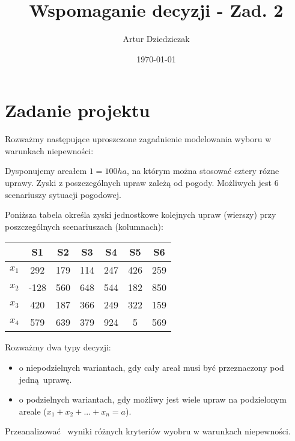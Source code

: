 \documentclass{article}
\title{Wspomaganie decyzji - Zad. 2}
\author{Artur Dziedziczak}
\date{\today}
\begin{document}
\maketitle

\newpage

\tableofcontents

\newpage

\section{Zadanie projektu}

Rozważmy następujące uproszczone zagadnienie modelowania wyboru w warunkach niepewności:

Dysponujemy areałem $1 = 100ha$, na którym można stosować cztery rózne uprawy. Zyski z poszczególnych upraw zależą od pogody. Możliwych jest 6 scenariuszy sytuacji pogodowej.

Poniższa tabela określa zyski jednostkowe kolejnych upraw (wierszy) przy poszczególnych scenariuszach (kolumnach):

\begin{table}[H]
  \begin{center}
    \begin{tabular}{ c |  c  c   c   c   c   c  }
      & S1 & S2 & S3 & S4 & S5 & S6 \\
      \hline
      $x_1$ & 292 & 179 & 114 & 247 & 426 & 259 \\
      $x_2$ & -128 & 560 & 648 & 544 & 182 & 850 \\
      $x_3$ & 420 & 187 & 366 & 249 & 322 & 159 \\
      $x_4$ & 579 & 639 & 379 & 924 & 5 & 569 \\
      \hline
    \end{tabular} 
  \end{center}
\end{table}

Rozważmy dwa typy decyzji:

\begin{itemize}
    \item o niepodzielnych wariantach, gdy cały areał musi być przeznaczony pod jedną uprawę.
    \item o podzielnych wariantach, gdy możliwy jest wiele upraw na podzielonym areale ($x_1 + x_2 + ... + x_n = a$).
\end{itemize}

Przeanalizować  wyniki różnych kryteriów wyobru w warunkach niepewności.
\end{document}
